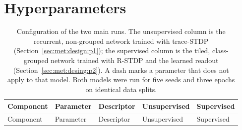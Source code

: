 \section{Hyperparameters}
\label{sec::app:hyperparameters}

\begin{longtable}{m{2.4cm}m{1.9cm}m{4.3cm}m{2.1cm}m{2.1cm}}
\caption{Configuration of the two main runs. The unsupervised column is the recurrent,
non-grouped network trained with trace-STDP (Section~\ref{sec:met:design:p1}); the supervised
column is the tiled, class-grouped network trained with R-STDP and the learned readout
(Section~\ref{sec:met:desing:p2}). A dash marks a parameter that does not apply to that model.
Both models were run for five seeds and three epochs on identical data splits.}
\label{tab:hparams}\\
\toprule
Component & Parameter & Descriptor & Unsupervised & Supervised \\
\midrule
\endfirsthead

\toprule
Component & Parameter & Descriptor & Unsupervised & Supervised \\
\midrule
\endhead


\end{longtable}
